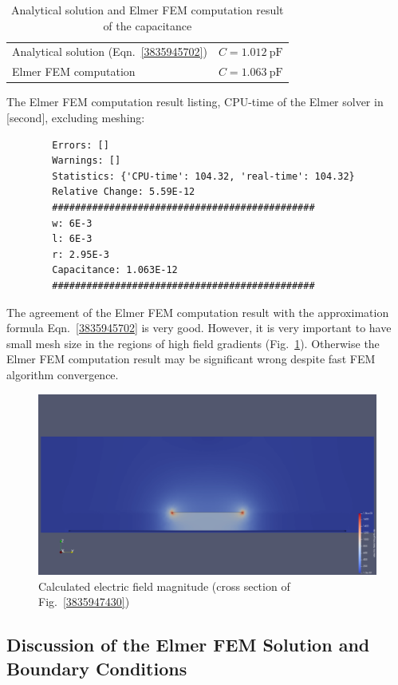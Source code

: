 \documentclass[10pt,a4paper,titlepage]{article}
\newcommand{\fig}[1]{Fig.~\ref{#1}}
\newcommand{\eqn}[1]{Eqn.~\ref{#1}}
\begin{document}
	\begin{table}[H]
		\centering
		\begin{tabular}{ll}
			Analytical solution (\eqn{3835945702}) & $C=\SI{1.012}{\pico\farad}$	\\
			Elmer FEM computation & $C=\SI{1.063}{\pico\farad}$ \\
		\end{tabular}
		\caption{Analytical solution and Elmer FEM computation result of the capacitance}
	\end{table}
	
	\noindent
	The Elmer FEM computation result listing, CPU-time of the Elmer solver in [second], excluding meshing:
	\begin{verbatim}
		Errors: []
		Warnings: []
		Statistics: {'CPU-time': 104.32, 'real-time': 104.32}
		Relative Change: 5.59E-12
		##############################################
		w: 6E-3
		l: 6E-3
		r: 2.95E-3
		Capacitance: 1.063E-12
		##############################################
	\end{verbatim}
	
	\noindent
	The agreement of the Elmer FEM computation result with the approximation formula \eqn{3835945702} is very good. However, it is very important to have small mesh size in the regions of high field gradients (\fig{3835951521}). Otherwise the Elmer FEM computation result may be significant wrong despite fast FEM algorithm convergence.
	
	\begin{figure}[H]
		\begin{center}
			\includegraphics[width=!, height=6cm, angle=0]{./fig/e_field.png}
			\caption{Calculated electric field magnitude (cross section of \fig{3835947430})}
			\label{3835951521}
		\end{center}
	\end{figure}
	
	
	\subsection{Discussion of the Elmer FEM Solution and Boundary Conditions}
	
\end{document}
